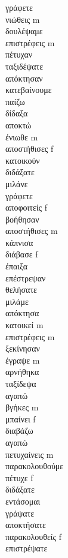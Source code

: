 γράφετε  \\ 
νιώθεις m \\ 
δουλέψαμε  \\ 
επιστρέφεις m \\ 
πέτυχαν  \\ 
ταξιδέψατε  \\ 
απόκτησαν  \\ 
κατεβαίνουμε  \\ 
παίζω  \\ 
δίδαξα  \\ 
αποκτώ  \\ 
ένιωθε m \\ 
αποστήθισες f \\ 
κατοικούν  \\ 
διδάξατε  \\ 
μιλάνε  \\ 
γράφετε  \\ 
αποφοιτείς f \\ 
βοήθησαν  \\ 
αποστήθισες m \\ 
κάπνισα  \\ 
διάβασε f \\ 
έπαιξα  \\ 
επέστρεψαν  \\ 
θελήσατε  \\ 
μιλάμε  \\ 
απόκτησα  \\ 
κατοικεί m \\ 
επιστρέφεις m \\ 
ξεκίνησαν  \\ 
έγραψε m \\ 
αρνήθηκα  \\ 
ταξίδεψα  \\ 
αγαπώ  \\ 
βγήκες m \\ 
μπαίνει f \\ 
διαβάζω  \\ 
αγαπώ  \\ 
πετυχαίνεις m \\ 
παρακολουθούμε  \\ 
πέτυχε f \\ 
διδάξατε  \\ 
εντάσομαι  \\ 
γράψατε  \\ 
αποκτήσατε  \\ 
παρακολουθείς f \\ 
επιστρέψατε  \\ 
